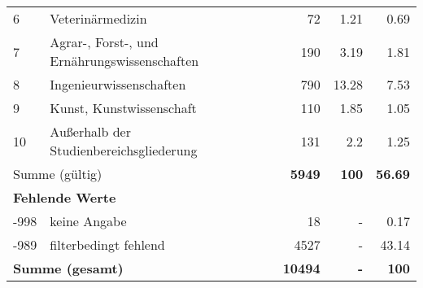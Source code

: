 \begin{longtable}{lXrrr}
     6 &
     \multicolumn{1}{X}{ Veterinärmedizin   } &


       \num{72} &
       \num[round-mode=places,round-precision=2]{1.21} &
         \num[round-mode=places,round-precision=2]{0.69} \\

     7 &
     \multicolumn{1}{X}{ Agrar-, Forst-, und Ernährungswissenschaften   } &


       \num{190} &
       \num[round-mode=places,round-precision=2]{3.19} &
         \num[round-mode=places,round-precision=2]{1.81} \\

     8 &
     \multicolumn{1}{X}{ Ingenieurwissenschaften   } &


       \num{790} &
       \num[round-mode=places,round-precision=2]{13.28} &
         \num[round-mode=places,round-precision=2]{7.53} \\

     9 &
     \multicolumn{1}{X}{ Kunst, Kunstwissenschaft   } &


       \num{110} &
       \num[round-mode=places,round-precision=2]{1.85} &
         \num[round-mode=places,round-precision=2]{1.05} \\

     10 &
     \multicolumn{1}{X}{ Außerhalb der Studienbereichsgliederung   } &


       \num{131} &
       \num[round-mode=places,round-precision=2]{2.2} &
         \num[round-mode=places,round-precision=2]{1.25} \\
     \midrule
     \multicolumn{2}{l}{Summe (gültig)} &
       \textbf{\num{5949}} &
     \textbf{\num{100}} &
       \textbf{\num[round-mode=places,round-precision=2]{56.69}} \\
     \multicolumn{5}{l}{\textbf{Fehlende Werte}}\\
       -998 &
       keine Angabe &
         \num{18} &
        - &
         \num[round-mode=places,round-precision=2]{0.17} \\
       -989 &
       filterbedingt fehlend &
         \num{4527} &
        - &
         \num[round-mode=places,round-precision=2]{43.14} \\
     \midrule
     \multicolumn{2}{l}{\textbf{Summe (gesamt)}} &
          \textbf{\num{10494}} &
        \textbf{-} &
        \textbf{\num{100}} \\
     \bottomrule
     \end{longtable}
     
